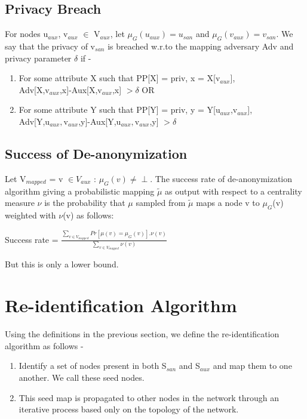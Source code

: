 \documentclass[preprint,12pt]{elsarticle}
\theoremstyle{definition}
\theoremstyle{remark}
\begin{document}
\subsection{Privacy Breach}
For nodes u$_{aux}$, v$_{aux}$ $\in$ V$_{aux}$, let $\mu_{G}(u_{aux}) = u_{san}$ and $\mu_{G}(v_{aux}) = v_{san}$. We say that the privacy of v$_{san}$ is breached w.r.to the mapping adversary Adv and privacy parameter $\delta$ if - 

\begin{enumerate}
\item For some attribute X such that PP[X] = priv, x = X[v$_{aux}$],\\ Adv[X,v$_{aux}$,x]-Aux[X,v$_{aux}$,x] $ > \delta$ OR
\item For some attribute Y such that PP[Y] = priv, y = Y[u$_{aux}$,v$_{aux}$], \\Adv[Y,u$_{aux},$v$_{aux}$,y]-Aux[Y,u$_{aux},$v$_{aux}$,y] $ > \delta$
\end{enumerate}

\subsection{Success of De-anonymization}
Let V$_{mapped}$ = v $\in V_{aux}$ : $\mu_{G}(v) \neq \perp$. The success rate of de-anonymization algorithm giving a probabilistic mapping $\tilde{\mu}$ as output with respect to a centrality measure $\nu$ is the probability that $\mu$ sampled from $\tilde{\mu}$ maps a node v to $\mu_{G}$(v) weighted with $\nu$(v) as follows:

\begin{center}
Success rate = $\frac{\sum_{v \in V_{mapped}} Pr[\mu(v) = \mu_G(v)].\nu(v)}{\sum_{v \in V_{mapped}} \nu(v)}$
\end{center}

But this is only a lower bound.

\section{Re-identification Algorithm}
Using the definitions in the previous section, we define the re-identification algorithm as follows - 

\begin{enumerate}
\item Identify a set of nodes present in both S$_{san}$ and S$_{aux}$ and map them to one another. We call these seed nodes.
\item This seed map is propagated to other nodes in the network through an iterative process based only on the topology of the network.
\end{enumerate}
\end{document}
